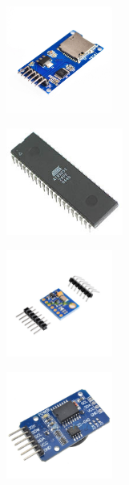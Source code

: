 \documentclass[12pt]{article}
\begin{document}
\begin{figure}[H]
\centering
\begin{minipage}{.4\textheight}
  \centering
  \includegraphics[height=3.5cm]{5.jpg}
  \label{fig:5}
\end{minipage}%
\begin{minipage}{.4\textheight}
  \centering
  \includegraphics[height=3.5cm]{6.jpg}
  \label{fig:6}
\end{minipage}
\end{figure}

\begin{figure}[H]
\centering
\begin{minipage}{.4\textheight}
  \centering
  \includegraphics[height=3.5cm]{7.jpg}
  \label{fig:7}
\end{minipage}%
\begin{minipage}{.4\textheight}
  \centering
  \includegraphics[height=3.5cm]{8.jpg}
  \label{fig:8}
\end{minipage}
\end{figure}
\end{document}
